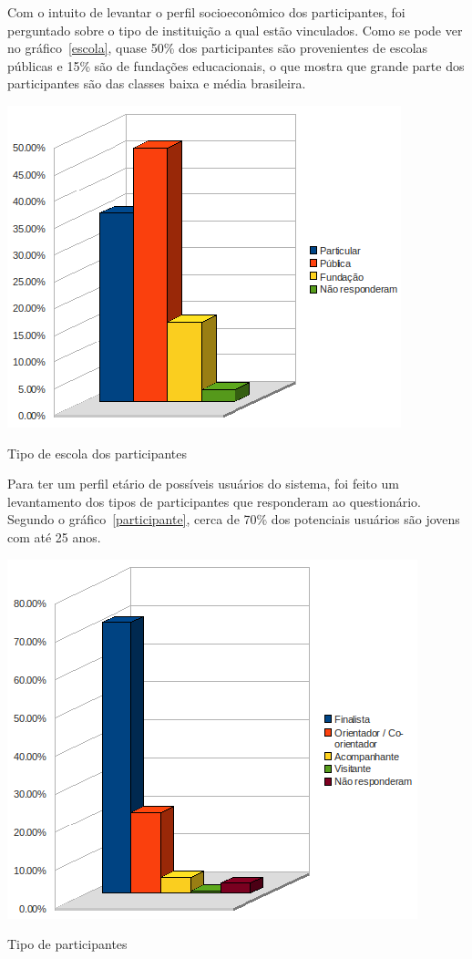    Com o intuito de levantar o perfil socioeconômico dos participantes, foi perguntado sobre o tipo de instituição a qual estão vinculados. Como se pode ver no gráfico~\ref{escola}, quase 50\% dos participantes são provenientes de escolas públicas e 15\% são de fundações educacionais, o que mostra que grande parte dos participantes são das classes baixa e média brasileira.

    \begin{grafico}
        \begin{center}
    \includegraphics[width=0.7\linewidth]{arquivos/escola.png}
        \end{center}
        \caption{Tipo de escola dos participantes}
        \label{escola}
    \end{grafico}

    Para ter um perfil etário de possíveis usuários do sistema, foi feito um levantamento dos tipos de participantes que responderam ao questionário. Segundo o gráfico~\ref{participante}, cerca de 70\% dos potenciais usuários são jovens com até 25 anos.

    \begin{grafico}
        \begin{center}
    \includegraphics[width=0.7\linewidth]{arquivos/participante.png}
        \end{center}
        \caption{Tipo de participantes}
        \label{participante}
    \end{grafico}

